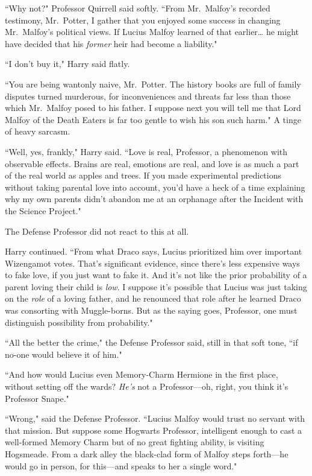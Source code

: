 ``Why not?" Professor Quirrell said softly. ``From Mr.~Malfoy's recorded testimony, Mr.~Potter, I gather that you enjoyed some success in changing Mr.~Malfoy's political views. If Lucius Malfoy learned of that earlier{\ldots} he might have decided that his \emph{former} heir had become a liability."

``I don't buy it," Harry said flatly.

``You are being wantonly naive, Mr.~Potter. The history books are full of family disputes turned murderous, for inconveniences and threats far less than those which Mr.~Malfoy posed to his father. I suppose next you will tell me that Lord Malfoy of the Death Eaters is far too gentle to wish his son such harm." A tinge of heavy sarcasm.

``Well, yes, frankly," Harry said. ``Love is real, Professor, a phenomenon with observable effects. Brains are real, emotions are real, and love is as much a part of the real world as apples and trees. If you made experimental predictions without taking parental love into account, you'd have a heck of a time explaining why my own parents didn't abandon me at an orphanage after the Incident with the Science Project."

The Defense Professor did not react to this at all.

Harry continued. ``From what Draco says, Lucius prioritized him over important Wizengamot votes. That's significant evidence, since there's less expensive ways to fake love, if you just want to fake it. And it's not like the prior probability of a parent loving their child is \emph{low}. I suppose it's possible that Lucius was just taking on the \emph{role} of a loving father, and he renounced that role after he learned Draco was consorting with Muggle-borns. But as the saying goes, Professor, one must distinguish possibility from probability."

``All the better the crime," the Defense Professor said, still in that soft tone, ``if no-one would believe it of him."

``And how would Lucius even Memory-Charm Hermione in the first place, without setting off the wards? \emph{He's} not a Professor—oh, right, you think it's Professor Snape."

``Wrong," said the Defense Professor. ``Lucius Malfoy would trust no servant with that mission. But suppose some Hogwarts Professor, intelligent enough to cast a well-formed Memory Charm but of no great fighting ability, is visiting Hogsmeade. From a dark alley the black-clad form of Malfoy steps forth—he would go in person, for this—and speaks to her a single word."

